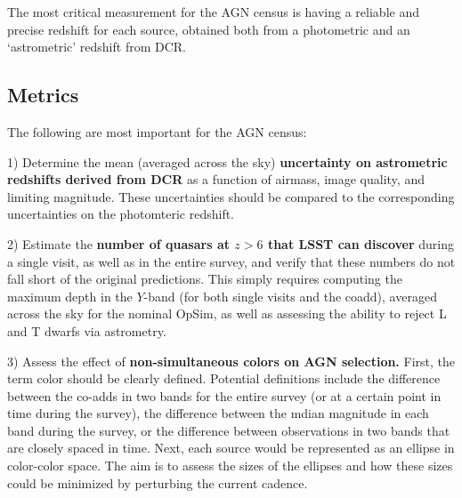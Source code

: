 The most critical measurement for the AGN census is having a reliable
and precise redshift for each source, obtained both from a photometric
and an `astrometric' redshift from DCR.



\subsection{Metrics}
\label{sec:\secname:metrics}



The following are most important for the AGN census:

1) Determine the mean (averaged across the sky) {\bf uncertainty on astrometric
redshifts derived from DCR} as a function of airmass, image quality, and
limiting magnitude. These uncertainties should be compared to the
corresponding uncertainties on the photomteric redshift.

2) Estimate the {\bf number of quasars at $z>6$ that LSST can discover}
during a single visit, as well as in the entire survey, and verify that
these numbers do not fall short of the original predictions. This
simply requires computing the maximum depth in the $Y$-band (for both 
single visits and the coadd), averaged across the sky for the nominal
OpSim, as well as assessing the ability to reject L and T dwarfs via astrometry.

3) Assess the effect of {\bf non-simultaneous colors on AGN selection.}
First, the term color should be clearly defined. Potential definitions
include the difference between the co-adds in two bands for the entire
survey (or at a certain point in time during the survey), the difference
between the mdian magnitude in each band during the survey, or the
difference between observations in two bands that are closely spaced in time.
Next, each source would be represented as an ellipse in color-color space.
The aim is to assess the sizes of the ellipses and how these sizes could be
minimized by perturbing the current cadence.

